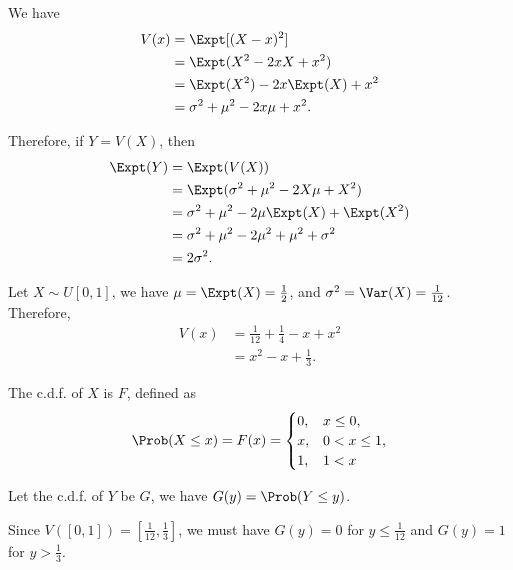 \Question{\currfilebase}

We have
\begin{align*}
    V(x) & = \Expt[(X-x)^2]                  \\
         & = \Expt(X^2 - 2xX + x^2)          \\
         & = \Expt(X^2) - 2x\Expt(X) + x^2   \\
         & = \sigma^2 + \mu^2 - 2x\mu + x^2.
\end{align*}

Therefore, if \(Y = V(X)\), then
\begin{align*}
    \Expt(Y) & = \Expt(V(X))                                   \\
             & = \Expt(\sigma^2 + \mu^2 - 2X\mu + X^2)         \\
             & = \sigma^2 + \mu^2 - 2\mu \Expt(X) + \Expt(X^2) \\
             & = \sigma^2 + \mu^2 - 2\mu^2 + \mu^2 + \sigma^2  \\
             & = 2\sigma^2.
\end{align*}

Let \(X \sim U[0, 1]\), we have \(\mu = \Expt(X) = \frac{1}{2}\), and \(\sigma^2 = \Var(X) = \frac{1}{12}\). Therefore,
\begin{align*}
    V(x) & = \frac{1}{12} + \frac{1}{4} - x + x^2 \\
         & = x^2 - x + \frac{1}{3}.
\end{align*}

The c.d.f. of \(X\) is \(F\), defined as
\[
    \Prob(X \leq x) = F(x) =
    \begin{cases}
        0, & x \leq 0,     \\
        x, & 0 < x \leq 1, \\
        1, & 1 < x
    \end{cases}
\]

Let the c.d.f. of \(Y\) be \(G\), we have \(G(y) = \Prob(Y \leq y)\).

Since \(V([0, 1]) = \left[\frac{1}{12}, \frac{1}{3}\right]\), we must have \(G(y) = 0\) for \(y \leq \frac{1}{12}\) and \(G(y) = 1\) for \(y > \frac{1}{3}\).

